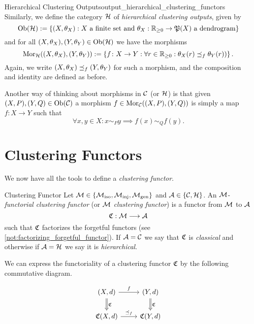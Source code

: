 \begin{definition}{Hierarchical Clustering Outputs\cite[Def.~3.3]{Carlsson2010}}{output_hierarchical_clustering_functors}
Similarly, we define the category $\mathcal{H}$ of \emph{hierarchical clustering outputs}, given by
\begin{equation*}
    \mathrm {Ob}(\mathcal{H}) := \{(X, \theta_X): X \text{ a finite set and } \theta_X: \mathbb R_{\geq0} \to \mathfrak{P}(X) \ \text{a dendrogram}\}
\end{equation*}
and for all $(X, \theta_X), (Y, \theta_Y) \in \mathrm {Ob}(\mathcal{H})$ we have the morphisms
\begin{equation*}
    \mathrm {Mor}_{\mathcal{H}}((X, \theta_X), (Y,\theta_Y)) :=
    \left\{f\colon X \to Y: \forall r \in \mathbb R_{\geq0}: \theta_X(r) \preceq_f \theta_Y(r)) \right\}.
\end{equation*}
Again, we write $(X, \theta_X) \preceq_f (Y, \theta_Y)$ for such a morphism, and the composition and identity are defined as before.
\end{definition}

Another way of thinking about morphisms in $\mathcal{C}$ (or $\mathcal{H}$) is that given ${(X,P), (Y,Q) \in \mathrm {Ob}(\mathcal{C})}$ a morphism $f \in \mathrm {Mor}_{\mathcal{C}}((X,P), (Y,Q))$ is simply a map $f\colon X \to Y$ such that
$$
\forall x,y \in X: x \sim_P y \implies f(x) \sim_Q f(y).
$$

\section{Clustering Functors}
We now have all the tools to define a \emph{clustering functor}.

\begin{definition}{Clustering Functor \cite[Sec.~4.1]{Carlsson2010}}{}
Let $\mathcal{M} \in \{{\mathcal{M}_\mathrm{iso}}, {\mathcal{M}_\mathrm{inj}}, {\mathcal{M}_\mathrm{gen}}\}$ and $\mathcal{A} \in \{\mathcal{C}, \mathcal{H}\}$. An $\mathcal{M}$-\emph{functorial clustering functor} (or $\mathcal{M}$ \emph{clustering functor}) is a functor from $\mathcal{M}$ to $\mathcal{A}$
$$\mathfrak{C} : \mathcal{M} \longrightarrow \mathcal{A}$$
such that $\mathfrak{C}$ factorizes the forgetful functors (see \ref{not:factorizing_forgetful_functor}). If $\mathcal{A} = \mathcal{C}$ we say that $\mathfrak{C}$ is \emph{classical} and otherwise if $\mathcal{A} = \mathcal{H}$ we say it is \emph{hierarchical}.
\end{definition}

We can express the functoriality of a clustering functor $\mathfrak{C}$ by the following commutative diagram.

\begin{equation*}
    \begin{tikzcd}
    {(X,d)} \arrow[r, "f"] \arrow[d, "\Cf", Rightarrow] & {(Y,d)} \arrow[d, "\Cf", Rightarrow] \\
    {\Cf(X,d)} \arrow[r, "\refines_f"]                  & {\Cf(Y,d)}
    \end{tikzcd}
\end{equation*}

